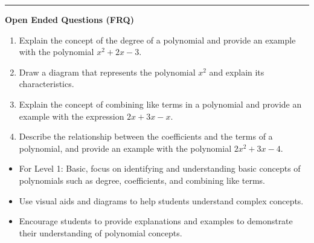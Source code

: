 \documentclass[10pt]{article}
\begin{document}
\vspace{-0.2cm}
\hrule
\vspace{0.2cm}
\textbf{\small Open Ended Questions (FRQ)}
\begin{enumerate}[label=\textbf{Q\arabic*.}, start=9, itemsep=5pt, topsep=0pt]

  \item \small Explain the concept of the degree of a polynomial and provide an example with the polynomial $x^2 + 2x - 3$. \vspace{2cm}

  \item \small Draw a diagram that represents the polynomial $x^2$ and explain its characteristics. \vspace{2cm}

  \item \small Explain the concept of combining like terms in a polynomial and provide an example with the expression $2x + 3x - x$. \vspace{2cm}

  \item \small Describe the relationship between the coefficients and the terms of a polynomial, and provide an example with the polynomial $2x^2 + 3x - 4$. \vspace{2cm}

\end{enumerate}

\vfill

\begin{tcolorbox}[colback=blue!5, colframe=mainblue!50, title=\small \textbf{Chef's Tips}, fonttitle=\bfseries, bottom=1mm]
\begin{itemize}[noitemsep, topsep=2pt, leftmargin=0.5cm]
  \item \scriptsize For Level 1: Basic, focus on identifying and understanding basic concepts of polynomials such as degree, coefficients, and combining like terms.\item \scriptsize Use visual aids and diagrams to help students understand complex concepts.\item \scriptsize Encourage students to provide explanations and examples to demonstrate their understanding of polynomial concepts.
\end{itemize}
\end{tcolorbox}
\end{document}

